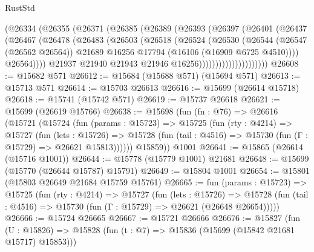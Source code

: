 \begin{lexlean}{RustStd}
\begin{coremodule}
                        (@26334
                          (@26355
                            (@26371
                              (@26385
                                (@26389
                                  (@26393
                                    (@26397
                                      (@26401
                                        (@26437
                                          (@26467
                                            (@26478
                                              (@26483
                                                (@26503
                                                  (@26518
                                                    (@26524
                                                      (@26530
                                                        (@26544
                                                          (@26547 (@26562 @26564))
                                                          @21689
                                                          @16256
                                                          @17794
                                                          (@16106 (@16909 @6725 @4510))))
                                                      @26564))))
                                              @21937
                                              @21940
                                              @21943
                                              @21946
                                              @16256)))))))))))))))))))))
@26608 := @15682 @571
@26612 := @15684 (@15688 @571) (@15694 @571)
@26613 := @15713 @571
@26614 := @15703 @26613
@26616 := @15699 (@26614 @15718)
@26618 := @15741 (@15742 @571)
@26619 := @15737 @26618
@26621 := @15699 (@26619 @15766)
@26638 := @15698
    (fun (fn : @76) =>
    @26616
      (@15721
        (@15724
          (fun (params : @15723) =>
          @15725
            (fun (rty : @4214) =>
            @15727
              (fun (lets : @15726) =>
              @15728 (fun (tail : @4516) => @15730 (fun (Γ : @15729) => @26621 @15813))))))
        @15859))
    @1001
@26641 := @15865 (@26614 (@15716 @1001))
@26644 := @15778 (@15779 @1001) @21681
@26648 := @15699 (@15770 (@26644 @15787) @15791)
@26649 := @15804 @1001
@26654 := @15801 (@15803 @26649 @21684 @15759 @15761)
@26665 := fun (params : @15723) =>
  @15725
    (fun (rty : @4214) =>
    @15727
      (fun (lets : @15726) =>
      @15728 (fun (tail : @4516) => @15730 (fun (Γ : @15729) => @26621 (@26648 @26654)))))
@26666 := @15724 @26665
@26667 := @15721 @26666
@26676 := @15827
    (fun (U : @15826) => @15828 (fun (t : @7) => @15836 (@15699 (@15842 @21681 @15717) @15853)))

\end{coremodule}
\end{lexlean}
